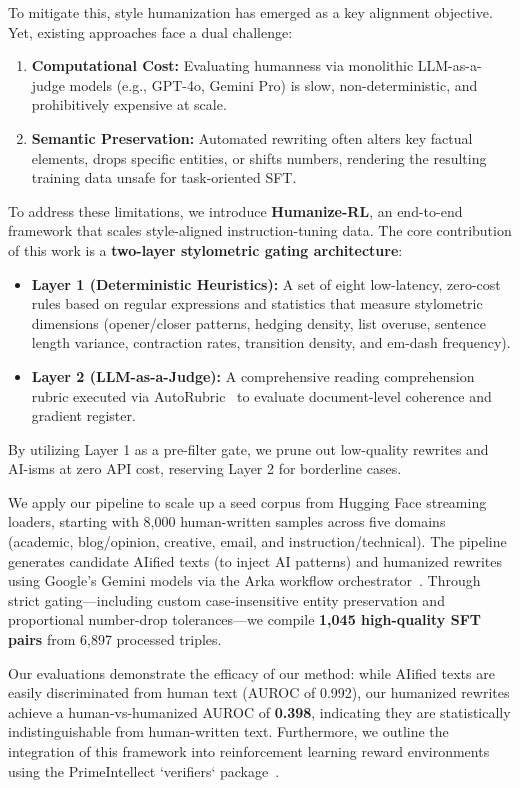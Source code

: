 \documentclass{article}
\begin{document}
To mitigate this, style humanization has emerged as a key alignment objective. Yet, existing approaches face a dual challenge:
\begin{enumerate}
    \item \textbf{Computational Cost:} Evaluating humanness via monolithic LLM-as-a-judge models (e.g., GPT-4o, Gemini Pro) is slow, non-deterministic, and prohibitively expensive at scale.
    \item \textbf{Semantic Preservation:} Automated rewriting often alters key factual elements, drops specific entities, or shifts numbers, rendering the resulting training data unsafe for task-oriented SFT.
\end{enumerate}

To address these limitations, we introduce \textbf{Humanize-RL}, an end-to-end framework that scales style-aligned instruction-tuning data. The core contribution of this work is a \textbf{two-layer stylometric gating architecture}:
\begin{itemize}
    \item \textbf{Layer 1 (Deterministic Heuristics):} A set of eight low-latency, zero-cost rules based on regular expressions and statistics that measure stylometric dimensions (opener/closer patterns, hedging density, list overuse, sentence length variance, contraction rates, transition density, and em-dash frequency).
    \item \textbf{Layer 2 (LLM-as-a-Judge):} A comprehensive reading comprehension rubric executed via AutoRubric~\citep{autorubric2026} to evaluate document-level coherence and gradient register.
\end{itemize}
By utilizing Layer 1 as a pre-filter gate, we prune out low-quality rewrites and AI-isms at zero API cost, reserving Layer 2 for borderline cases. 

We apply our pipeline to scale up a seed corpus from Hugging Face streaming loaders, starting with 8,000 human-written samples across five domains (academic, blog/opinion, creative, email, and instruction/technical). The pipeline generates candidate AIified texts (to inject AI patterns) and humanized rewrites using Google's Gemini models via the Arka workflow orchestrator~\citep{arka}. Through strict gating---including custom case-insensitive entity preservation and proportional number-drop tolerances---we compile \textbf{1,045 high-quality SFT pairs} from 6,897 processed triples. 

Our evaluations demonstrate the efficacy of our method: while AIified texts are easily discriminated from human text (AUROC of 0.992), our humanized rewrites achieve a human-vs-humanized AUROC of \textbf{0.398}, indicating they are statistically indistinguishable from human-written text. Furthermore, we outline the integration of this framework into reinforcement learning reward environments using the PrimeIntellect `verifiers` package~\citep{verifiers}.
\end{document}
